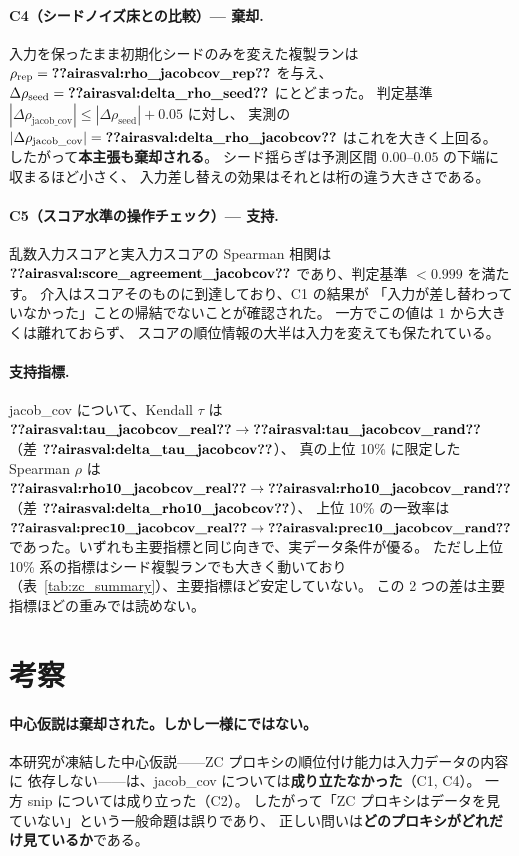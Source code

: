 \documentclass[11pt]{article}
\providecommand{\airasval}[1]{\textbf{??airasval:\detokenize{#1}??}}
\begin{document}
\paragraph{C4（シードノイズ床との比較）— \textbf{棄却}.}
入力を保ったまま初期化シードのみを変えた複製ランは
$\rho_{\mathrm{rep}} = \airasval{rho_jacobcov_rep}$ を与え、
$\Delta\rho_{\mathrm{seed}} = \airasval{delta_rho_seed}$ にとどまった。
判定基準 $|\Delta\rho_{\mathrm{jacob\_cov}}| \le |\Delta\rho_{\mathrm{seed}}| + 0.05$ に対し、
実測の $|\Delta\rho_{\mathrm{jacob\_cov}}| = \airasval{delta_rho_jacobcov}$ はこれを大きく上回る。
したがって\textbf{本主張も棄却される}。
シード揺らぎは予測区間 $0.00$--$0.05$ の下端に収まるほど小さく、
入力差し替えの効果はそれとは桁の違う大きさである。

\paragraph{C5（スコア水準の操作チェック）— 支持.}
乱数入力スコアと実入力スコアの Spearman 相関は
$\airasval{score_agreement_jacobcov}$ であり、判定基準 $<0.999$ を満たす。
介入はスコアそのものに到達しており、C1 の結果が
「入力が差し替わっていなかった」ことの帰結でないことが確認された。
一方でこの値は $1$ から大きくは離れておらず、
スコアの順位情報の大半は入力を変えても保たれている。

\paragraph{支持指標.}
jacob\_cov について、Kendall $\tau$ は
$\airasval{tau_jacobcov_real} \to \airasval{tau_jacobcov_rand}$
（差 $\airasval{delta_tau_jacobcov}$）、
真の上位 10\% に限定した Spearman $\rho$ は
$\airasval{rho10_jacobcov_real} \to \airasval{rho10_jacobcov_rand}$
（差 $\airasval{delta_rho10_jacobcov}$）、
上位 10\% の一致率は
$\airasval{prec10_jacobcov_real} \to \airasval{prec10_jacobcov_rand}$
であった。いずれも主要指標と同じ向きで、実データ条件が優る。
ただし上位 10\% 系の指標はシード複製ランでも大きく動いており
（表~\ref{tab:zc_summary}）、主要指標ほど安定していない。
この 2 つの差は主要指標ほどの重みでは読めない。

\section{考察}
\label{sec:discussion}

\paragraph{中心仮説は棄却された。しかし一様にではない。}
本研究が凍結した中心仮説——ZC プロキシの順位付け能力は入力データの内容に
依存しない——は、jacob\_cov については\textbf{成り立たなかった}（C1, C4）。
一方 snip については成り立った（C2）。
したがって「ZC プロキシはデータを見ていない」という一般命題は誤りであり、
正しい問いは\textbf{どのプロキシがどれだけ見ているか}である。
\end{document}
